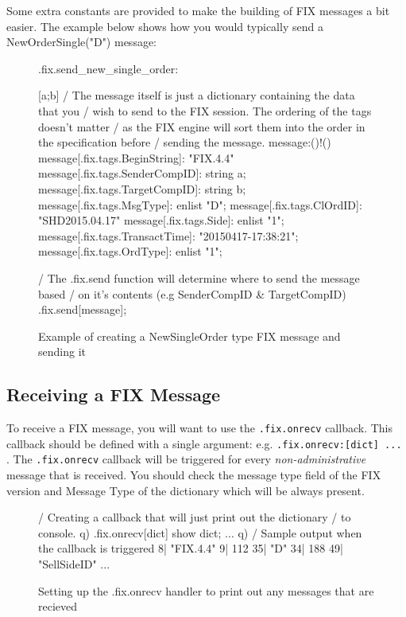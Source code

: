 Some extra constants are provided to make the building of FIX messages a bit easier. The example below shows how you would typically send a NewOrderSingle("D") message:

\begin{figure}[H]
\begin{qcode}
.fix.send_new_single_order: {[a;b]
	/ The message itself is just a dictionary containing the data that you
	/ wish to send to the FIX session. The ordering of the tags doesn't matter
	/ as the FIX engine will sort them into the order in the specification before
	/ sending the message.
	message:()!()
	message[.fix.tags.BeginString]: "FIX.4.4"
	message[.fix.tags.SenderCompID]: string a;
	message[.fix.tags.TargetCompID]: string b;
	message[.fix.tags.MsgType]: enlist "D";
	message[.fix.tags.ClOrdID]: "SHD2015.04.17"
	message[.fix.tags.Side]: enlist "1";
	message[.fix.tags.TransactTime]: "20150417-17:38:21";
	message[.fix.tags.OrdType]: enlist "1";

	/ The .fix.send function will determine where to send the message based
	/ on it's contents (e.g SenderCompID & TargetCompID)
	.fix.send[message];
}
\end{qcode}
\caption{Example of creating a NewSingleOrder type FIX message and sending it}
\end{figure}

\subsection{Receiving a FIX Message}

To receive a FIX message, you will want to use the \texttt{.fix.onrecv} callback. This callback should be defined with a single argument: e.g. \texttt{.fix.onrecv:{[dict] ... }}. The \texttt{.fix.onrecv} callback will be triggered for every \textit{non-administrative} message that is received. You should check the message type field of the FIX version and Message Type of the dictionary which will be always present.

\begin{figure}[H]
\begin{qcode}
/ Creating a callback that will just print out the dictionary
/ to console.
q) .fix.onrecv{[dict] show dict; }
...
q)
/ Sample output when the callback is triggered
8|  "FIX.4.4"
9|  112
35| "D"
34| 188
49| "SellSideID"
...
\end{qcode}
\caption{Setting up the .fix.onrecv handler to print out any messages that are recieved}
\end{figure}

